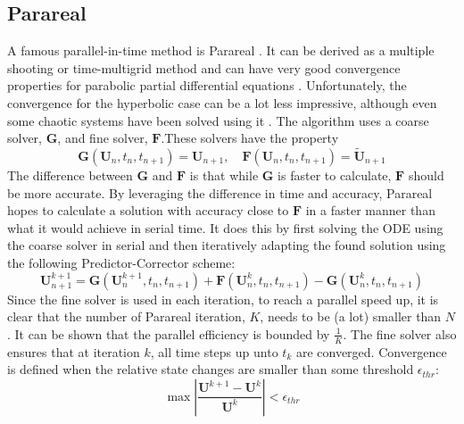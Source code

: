 \subsection{Parareal}
\label{subsec:intro parareal}
A famous parallel-in-time method is Parareal \cite{lions_resolution_2001}. It can be derived as a multiple shooting or time-multigrid method and can have very good convergence properties for parabolic partial differential equations \cite{gander_analysis_2007}. Unfortunately, the convergence for the hyperbolic case can be a lot less impressive, although even some chaotic systems have been solved using it \cite{d_samaddar_parallelization_2010}. The algorithm uses a coarse solver, $\textbf{G}$, and fine solver, $\textbf{F}$.These solvers have the property \[\textbf{G}(\textbf{U}_n, t_n, t_{n+1}) = \textbf{U}_{n+1}, \quad
\textbf{F}(\textbf{U}_n, t_n, t_{n+1}) = \tilde{\textbf{U}}_{n+1}
\]
The difference between $\textbf{G}$ and $\textbf{F}$ is that while $\textbf{G}$ is faster to calculate, $\textbf{F}$ should be more accurate. By leveraging the difference in time and accuracy, Parareal hopes to calculate a solution with accuracy close to $\textbf{F}$ in a faster manner than what it would achieve in serial time. It does this by first solving the ODE using the coarse solver in serial and then iteratively adapting the found solution using the following Predictor-Corrector scheme:
\[\textbf{U}_{n+1}^{k+1} = \textbf{G}(\textbf{U}_n^{k+1}, t_n, t_{n+1}) + \textbf{F}(\textbf{U}_n^k, t_n, t_{n+1}) - \textbf{G}(\textbf{U}_n^k, t_n, t_{n+1})\]
Since the fine solver is used in each iteration, to reach a parallel speed up, it is clear that the number of Parareal iteration, $K$, needs to be (a lot) smaller than $N$. It can be shown that the parallel efficiency is bounded by $\frac{1}{K}$. The fine solver also ensures that at iteration $k$, all time steps up unto $t_k$ are converged. Convergence is defined when the relative state changes are smaller than some threshold $\epsilon_{thr}$:\[\max\left|\frac{\textbf{U}^{k+1} -\textbf{U}^{k}}{\textbf{U}^{k}} \right| < \epsilon_{thr}\]

